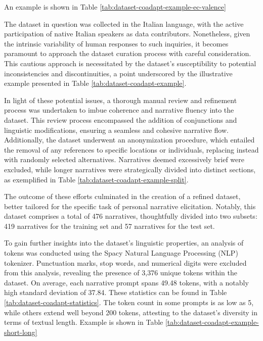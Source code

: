 
An example is shown in Table \ref{tab:dataset-coadapt-example-ec-valence}

The dataset in question was collected in the Italian language, with the active participation of native Italian speakers as data contributors. Nonetheless, given the intrinsic variability of human responses to such inquiries, it becomes paramount to approach the dataset curation process with careful consideration. This cautious approach is necessitated by the dataset's susceptibility to potential inconsistencies and discontinuities, a point underscored by the illustrative example presented in Table \ref{tab:dataset-coadapt-example}.


In light of these potential issues, a thorough manual review and refinement process was undertaken to imbue coherence and narrative fluency into the dataset. This review process encompassed the addition of conjunctions and linguistic modifications, ensuring a seamless and cohesive narrative flow. Additionally, the dataset underwent an anonymization procedure, which entailed the removal of any references to specific locations or individuals, replacing instead with randomly selected alternatives. Narratives deemed excessively brief were excluded, while longer narratives were strategically divided into distinct sections, as exemplified in Table \ref{tab:dataset-coadapt-example-split}.

The outcome of these efforts culminated in the creation of a refined dataset, better tailored for the specific task of personal narrative elicitation. Notably, this dataset comprises a total of 476 narratives, thoughtfully divided into two subsets: 419 narratives for the training set and 57 narratives for the test set.


To gain further insights into the dataset's linguistic properties, an analysis of tokens was conducted using the Spacy Natural Language Processing (NLP) tokenizer. Punctuation marks, stop words, and numerical digits were excluded from this analysis, revealing the presence of 3,376 unique tokens within the dataset. On average, each narrative prompt spans 49.48 tokens, with a notably high standard deviation of 37.84. These statistics can be found in Table \ref{tab:dataset-coadapt-statistics}. 
The token count in some prompts is as low as 5, while others extend well beyond 200 tokens, attesting to the dataset's diversity in terms of textual length. Example is shown in Table \ref{tab:dataset-coadapt-example-short-long}


